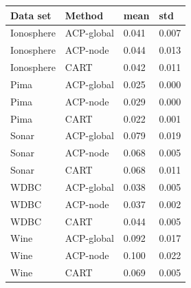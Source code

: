 \begin{tabular}{llll}
\toprule
Data set & Method & mean & std \\
\midrule
Ionosphere & ACP-global & 0.041 & 0.007 \\
Ionosphere & ACP-node & 0.044 & 0.013 \\
Ionosphere & CART & 0.042 & 0.011 \\
Pima & ACP-global & 0.025 & 0.000 \\
Pima & ACP-node & 0.029 & 0.000 \\
Pima & CART & 0.022 & 0.001 \\
Sonar & ACP-global & 0.079 & 0.019 \\
Sonar & ACP-node & 0.068 & 0.005 \\
Sonar & CART & 0.068 & 0.011 \\
WDBC & ACP-global & 0.038 & 0.005 \\
WDBC & ACP-node & 0.037 & 0.002 \\
WDBC & CART & 0.044 & 0.005 \\
Wine & ACP-global & 0.092 & 0.017 \\
Wine & ACP-node & 0.100 & 0.022 \\
Wine & CART & 0.069 & 0.005 \\
\bottomrule
\end{tabular}
